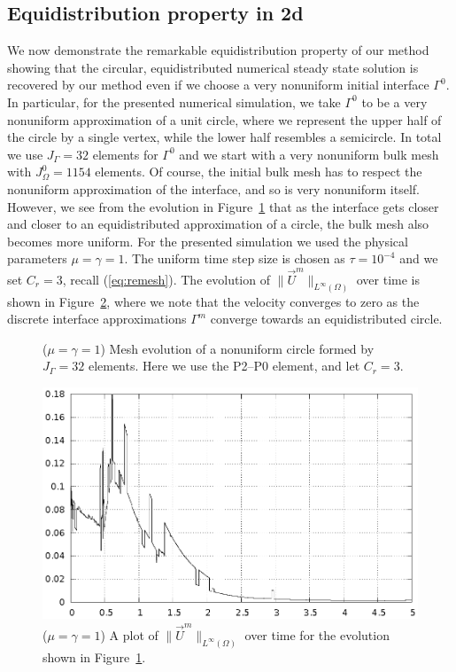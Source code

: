 \documentclass[a4paper,12pt,onecolumn]{article}
\begin{document}
\subsection{Equidistribution property in 2d}
We now demonstrate the remarkable equidistribution property of our method
showing that the circular, equidistributed numerical steady state solution is
recovered by our method even if we choose a very nonuniform initial interface
$\Gamma^0$. In particular, for the presented numerical simulation, we take
$\Gamma^0$ to be a very nonuniform approximation of a unit circle, where we
represent the upper half of the circle by a single vertex, while the lower half
resembles a semicircle. In total we use $J_\Gamma = 32$ elements for $\Gamma^0$
and we start with a very nonuniform bulk mesh with $J_\Omega^0 = 1154$ elements.
Of course, the initial bulk mesh has to respect the nonuniform approximation
of the interface, and so is very nonuniform itself. However, we see from the
evolution in Figure~\ref{fig:nonuniform_bubble_32_both} that as the interface
gets closer and closer to an equidistributed approximation of a circle, the
bulk mesh also becomes more uniform. For the presented simulation we used the
physical parameters $\mu= \gamma=1$. The uniform time step size is chosen as
$\tau=10^{-4}$ and we set $C_r=3$, recall (\ref{eq:remesh}). The evolution of
$\|\vec U^m\|_{L^\infty(\Omega)}$ over time is shown in
Figure~\ref{fig:nonuniform_bubble_velocity_32_both}, where we note that the
velocity converges to zero as the discrete interface approximations $\Gamma^m$
converge towards an equidistributed circle.
\begin{figure}[htbp]
\centering
{}
\caption{($\mu=\gamma=1$) Mesh evolution of a nonuniform circle formed by
$J_\Gamma = 32$ elements. Here we use the P2--P0 element, and let $C_r = 3$.}
\label{fig:nonuniform_bubble_32_both}
\end{figure}

\begin{figure}[htbp]
\centering
\includegraphics[width=.45\textwidth]
{figures/nonuniform_bubble_velocity_32_both.ps}
\caption{($\mu=\gamma=1$) A plot of $\|\vec U^m\|_{L^\infty(\Omega)}$ over time
for the evolution shown in Figure~\ref{fig:nonuniform_bubble_32_both}.}
\label{fig:nonuniform_bubble_velocity_32_both}
\end{figure}
\end{document}
